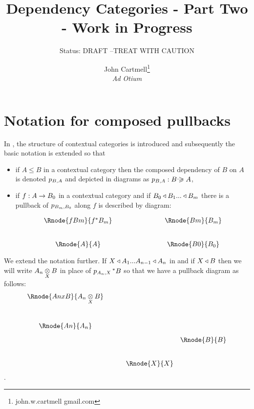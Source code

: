 \documentclass[10pt,a4paper]{scrartcl}
\title{Dependency Categories - Part Two - Work in Progress}
\author{John Cartmell\footnote{john.w.cartmell gmail.com}\\ \normalsize{\textit{Ad Otium}}}
\subtitle{Status: \normalsize{DRAFT --TREAT WITH CAUTION}}
\begin{document}
\maketitle

\section{Notation for composed pullbacks}
In \cite{Cartmell86}, the structure of contextual categories is introduced and subsequently
the basic notation is extended so that 
\begin{itemize}
\item{if $A \leq B$ in a contextual category then the composed dependency of
$B$ on $A$ is 
denoted $\pc{B}{A}$ and depicted in diagrams as $\pc{B}{A}:B \raisebox{1pt}{---}\!\!\!\!\!\!\geqslant A$,}
\item{if $f: A \morph B_0$ in a contextual category  and if 
$B_0 \base B_1 ... \base B_m$ there is a  pullback of $\pc{B_m}{B_0}$ along $f$
is described by diagram:

\begin{displaymath}
\begin{array}{cp{2cm}c}
\Rnode{fBm} {f \sub B_m}    &            &  \Rnode{Bm}{B_m}   \\ [0.8cm]
\Rnode{A}{A}                &            &  \Rnode{B0}{B_0}   
\end{array}
\end{displaymath}
}
\end{itemize}


We extend the notation further. If $X \base A_1 ... A_{n-1} \base A_n$ in  and
if $X \base B$ then we will write $\crossx{A_n}{B}{X}$ in place of $\pc{A_n}{X}\,\sub B$ so that 
we have a pullback diagram as follows:
\begin{displaymath}
\begin{array}{c p{0.45cm} c c}
\Rnode{AnxB}{\crossx{A_n}{B}{X}}&&            &              \\ [1.1cm]
\Rnode{An}{A_n}                 &&            &               \\ [0.3cm]
                                &&            & \Rnode{B}{B}  \\ [0.8cm]
                                &&\Rnode{X}{X}&                
\end{array}
\end{displaymath}
.
\end{document}
